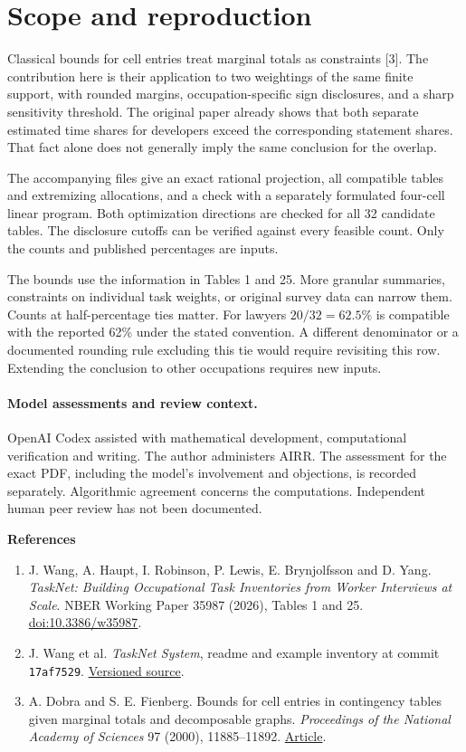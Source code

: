 \documentclass[11pt]{article}
\begin{document}
\newpage
\section{Scope and reproduction}
Classical bounds for cell entries treat marginal totals as constraints [3]. The contribution here is their application to two weightings of the same finite support, with rounded margins, occupation-specific sign disclosures, and a sharp sensitivity threshold. The original paper already shows that both separate estimated time shares for developers exceed the corresponding statement shares. That fact alone does not generally imply the same conclusion for the overlap.

The accompanying files give an exact rational projection, all compatible tables and extremizing allocations, and a check with a separately formulated four-cell linear program. Both optimization directions are checked for all 32 candidate tables. The disclosure cutoffs can be verified against every feasible count. Only the counts and published percentages are inputs.

The bounds use the information in Tables 1 and 25. More granular summaries, constraints on individual task weights, or original survey data can narrow them. Counts at half-percentage ties matter. For lawyers $20/32=62.5\%$ is compatible with the reported 62\% under the stated convention. A different denominator or a documented rounding rule excluding this tie would require revisiting this row. Extending the conclusion to other occupations requires new inputs.

\paragraph{Model assessments and review context.} OpenAI Codex assisted with mathematical development, computational verification and writing. The author administers AIRR. The assessment for the exact PDF, including the model's involvement and objections, is recorded separately. Algorithmic agreement concerns the computations. Independent human peer review has not been documented.

\smallskip\noindent\textbf{References}
\begin{enumerate}\small
\item J. Wang, A. Haupt, I. Robinson, P. Lewis, E. Brynjolfsson and D. Yang. \emph{TaskNet: Building Occupational Task Inventories from Worker Interviews at Scale}. NBER Working Paper 35987 (2026), Tables 1 and 25. \href{https://doi.org/10.3386/w35987}{doi:10.3386/w35987}.
\item J. Wang et al. \emph{TaskNet System}, readme and example inventory at commit \texttt{17af7529}. \href{https://github.com/jennjwang/tasknet-system/tree/17af7529b697f6fbc7fc6832b30f4248572f717f}{Versioned source}.
\item A. Dobra and S. E. Fienberg. Bounds for cell entries in contingency tables given marginal totals and decomposable graphs. \emph{Proceedings of the National Academy of Sciences} 97 (2000), 11885--11892. \href{https://sites.stat.washington.edu/adobra/Files/Papers/pnas.pdf}{Article}.
\end{enumerate}
\end{document}
